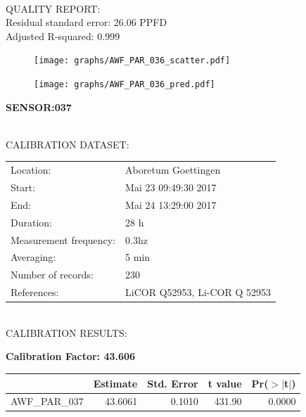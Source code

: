 \documentclass[oneside]{report}
\begin{document}
\hrulefill\\
QUALITY REPORT:\\
Residual standard error: 26.06 PPFD\\
Adjusted R-squared: 0.999



\begin{figure}[H]
  \centering
  \texttt{[image: graphs/AWF\_PAR\_036\_scatter.pdf]}
\end{figure}




\begin{figure}[H]
  \centering
  \texttt{[image: graphs/AWF\_PAR\_036\_pred.pdf]}
\end{figure}

\pagebreak


\begin{center}
\large{\textbf{SENSOR:037}}\\
\end{center}

\hrulefill\\
CALIBRATION DATASET:\\
\begin{table}[h!]
  \centering
  \label{tab:table1}
  \begin{tabular}{ll}
    Location: & Aboretum Goettingen\\ 
    
    
    Start:  & Mai 23 09:49:30 2017 \\
    End:   & Mai 24 13:29:00 2017\\ 
    Duration: & 28 h\\
    Measurement frequency: & 0.3hz\\
    Averaging:  &5 min\\
    Number of records: & 230 \\
    References: & LiCOR Q52953, Li-COR Q 52953 \\
  \end{tabular}
\end{table}

\hrulefill\\
CALIBRATION RESULTS:\\


\begin{center}
\textbf{\large{Calibration Factor: 43.606}}\\
\end{center}
\begin{table}[ht]
\centering
\begin{tabular}{rrrrr}
  \hline
 & Estimate & Std. Error & t value & Pr($>$$|$t$|$) \\ 
  \hline
AWF\_PAR\_037 & 43.6061 & 0.1010 & 431.90 & 0.0000 \\ 
   \hline
\end{tabular}
\end{table}
\end{document}
